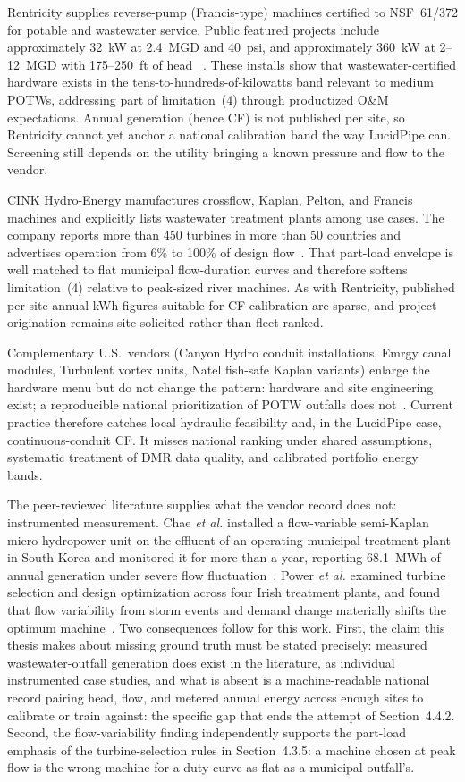 \documentclass[12pt,letterpaper]{report}
\begin{document}
Rentricity supplies reverse-pump (Francis-type) machines certified to NSF~61/372 for
potable and wastewater service. Public featured projects include approximately 32~kW at
2.4~MGD and 40~psi, and approximately 360~kW at 2--12~MGD with 175--250~ft of head
~\cite{rentricity}. These installs show that wastewater-certified hardware exists in the
tens-to-hundreds-of-kilowatts band relevant to medium POTWs, addressing part of
limitation~(4) through productized O\&M expectations. Annual generation (hence CF) is not
published per site, so Rentricity cannot yet anchor a national calibration band the way
LucidPipe can. Screening still depends on the utility bringing a known pressure and flow
to the vendor.

CINK Hydro-Energy manufactures crossflow, Kaplan, Pelton, and Francis machines and
explicitly lists wastewater treatment plants among use cases. The company reports more than
450 turbines in more than 50 countries and advertises operation from 6\% to 100\% of design
flow~\cite{cink}. That part-load envelope is well matched to flat municipal flow-duration
curves and therefore softens limitation~(4) relative to peak-sized river machines. As with
Rentricity, published per-site annual kWh figures suitable for CF calibration are sparse,
and project origination remains site-solicited rather than fleet-ranked.

Complementary U.S.\ vendors (Canyon Hydro conduit installations, Emrgy canal modules,
Turbulent vortex units, Natel fish-safe Kaplan variants) enlarge the hardware menu but do
not change the pattern: hardware and site engineering exist; a reproducible national
prioritization of POTW outfalls does not~\cite{doe_vision}. Current practice therefore
catches local hydraulic feasibility and, in the LucidPipe case, continuous-conduit CF. It
misses national ranking under shared assumptions, systematic treatment of DMR data quality,
and calibrated portfolio energy bands.

The peer-reviewed literature supplies what the vendor record does not: instrumented
measurement. Chae \emph{et al.} installed a flow-variable semi-Kaplan micro-hydropower
unit on the effluent of an operating municipal treatment plant in South Korea and monitored
it for more than a year, reporting 68.1~MWh of annual generation under severe flow
fluctuation~\cite{chae2015}. Power \emph{et al.} examined turbine selection and design
optimization across four Irish treatment plants, and found that flow variability from storm
events and demand change materially shifts the optimum machine~\cite{power2017}. Two
consequences follow for this work. First, the claim this thesis makes about missing ground
truth must be stated precisely: measured wastewater-outfall generation does exist in the
literature, as individual instrumented case studies, and what is absent is a machine-readable
national record pairing head, flow, and metered annual energy across enough sites to
calibrate or train against: the specific gap that ends the attempt of Section~4.4.2.
Second, the flow-variability finding independently supports the part-load emphasis of the
turbine-selection rules in Section~4.3.5: a machine chosen at peak flow is the wrong machine
for a duty curve as flat as a municipal outfall's.
\end{document}
